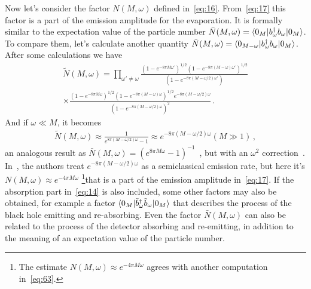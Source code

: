 \documentclass[12pt,a4paper]{article}
\begin{document}
Now let's consider the factor $N(M,\omega)$ defined in~\eqref{eq:16}. From~\eqref{eq:17} this factor is a part of the emission amplitude for the evaporation. It is formally similar to the expectation value of the particle number
$\bar{N}(M,\omega)=\langle0_{M}\arrowvert
b_{\omega}^{\dag}b_{\omega}\arrowvert0_M\rangle$. To compare them, let's
calculate another quantity
$\tilde{N}(M,\omega)=\langle0_{M-\omega}\arrowvert
b_{\omega}^{\dag}b_{\omega}\arrowvert0_M\rangle$. After some
calculations we have
\begin{equation}
\label{eq:19}
\begin{split}
\tilde{N}(M,\omega) = \prod_{\omega'\neq\omega}\frac{(1-e^{-8\pi
M\omega'})^{1/2}(1-e^{-8\pi (M-\omega)\omega'})^{1/2}}{(1-e^{-8\pi
(M-\omega/2)\omega'})}\\ \times\frac{(1-e^{-8\pi
M\omega})^{1/2}(1-e^{-8\pi (M-\omega)\omega})^{1/2}e^{-8\pi
(M-\omega/2)\omega}}{(1-e^{-8\pi (M-\omega/2)\omega})^{2}} \,.
\end{split}
\end{equation}
And if $\omega\ll M$, it becomes
\begin{equation}
\label{eq:20}
\begin{split}
\tilde{N}(M,\omega)\approx \frac{1}{e^{8\pi
(M-\omega/2)\omega}-1}\approx e^{-8\pi (M-\omega/2)\omega}(M\gg 1)
\,,
\end{split}
\end{equation}
an analogous result as $\bar{N}(M,\omega)=(e^{8\pi
M\omega}-1)^{-1}$~\cite{a,b}, but with an $\omega^2$
correction~\cite{k}. In~\cite{k}, the authors treat
$e^{-8\pi (M-\omega/2)\omega}$ as a semiclassical emission rate,
but here it's $N(M,\omega)\approx e^{-4\pi M\omega}$ \footnote{The
estimate $N(M,\omega)\approx e^{-4\pi M\omega}$ agrees with
another computation in~\eqref{eq:63}.}that is a
part of the emission amplitude in~\eqref{eq:17}. If the absorption part in~\eqref{eq:14} is also included, some other factors may also be obtained,
for example a factor $\langle0_{M}\arrowvert\tilde{b}_{\omega}^{\dag}\tilde{b}_{\omega}\arrowvert0_M\rangle$ that
describes the process of the black hole emitting and re-absorbing. Even the factor $\bar{N}(M,\omega)$ can also be related to the process of the detector absorbing and re-emitting, in addition to the meaning of an expectation value of the particle number.
\end{document}
